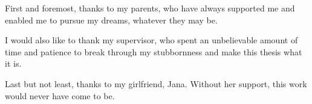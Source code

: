 \documentclass[english,master,unicode,bw]{ctufit-thesis}
\begin{document}
 
\frontmatter\frontmatterinit %


\thispagestyle{empty}\cleardoublepage\maketitle %

\imprintpage %

\tableofcontents %
\listoffigures %
\begingroup
\let\clearpage\relax
\listoftables %
\endgroup

\begin{acknowledgmentpage}
    First and foremost, thanks to my parents, who have always supported me and
    enabled me to pursue my dreams, whatever they may be.

    I would also like to thank my supervisor, who spent an unbelievable amount
    of time and patience to break through my stubbornness and make this thesis
    what it is.

    Last but not least, thanks to my girlfriend, Jana. Without her support,
    this work would never have come to be.
\end{acknowledgmentpage} 
\end{document}
